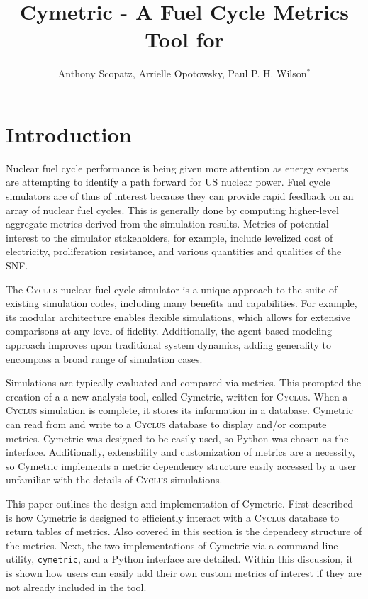 \documentclass{anstrans}
\title{Cymetric - A Fuel Cycle Metrics Tool for \cyclus}
\author{Anthony Scopatz, Arrielle Opotowsky, Paul P. H. Wilson$^{*}$}
\institute{
$^{*}$Department of Engineering Physics, University of Wisconsin - Madison, 
1500 Engineering Drive, Madison WI 53703
}
\newcommand{\cyclus}{\textsc{Cyclus}\xspace}
\newcommand{\code}[1]{{\color{code}\texttt{#1}}}
\begin{document}
\section{Introduction}
Nuclear fuel cycle performance is being given more attention as energy 
experts are attempting to identify a path forward for \gls{US} nuclear power. 
Fuel cycle simulators are of thus of interest because they can provide rapid 
feedback on an array of nuclear fuel cycles. This is generally done by 
computing higher-level aggregate metrics derived from the simulation results. 
Metrics of potential interest to the simulator stakeholders, for example, 
include levelized cost of electricity, proliferation resistance, and various 
quantities and qualities of the \gls{SNF}.

The \cyclus nuclear fuel cycle simulator is a unique approach to the suite of 
existing simulation codes, including many benefits and capabilities.
For example, its modular architecture enables flexible simulations, which 
allows for extensive comparisons at any level of fidelity. Additionally, the 
agent-based modeling approach improves upon traditional system dynamics, adding 
generality to encompass a broad range of simulation cases. \cite{cyclus2015, cyclus_v1.2} 

Simulations are typically evaluated and compared via metrics. This 
prompted the creation of a a new analysis tool, called Cymetric, written for 
\cyclus. When a \cyclus simulation is complete, it stores its information in a 
database. Cymetric can read from and write to a \cyclus database to display 
and/or compute metrics. Cymetric was designed to be easily used, so Python was 
chosen as the interface. Additionally, extensbility and customization of metrics
are a necessity, so Cymetric implements a metric dependency structure easily accessed by a user unfamiliar with the details of \cyclus simulations.

This paper outlines the design and implementation of Cymetric. First described 
is how Cymetric is designed to efficiently interact with a \cyclus database to 
return tables of metrics. Also covered in this section is the dependecy structure of the metrics. 
Next, the two implementations of Cymetric via a command line utility, \code{cymetric},
and a Python interface are detailed.  Within this discussion, it is shown how users can easily 
add their own custom metrics of interest if they are not already included in the
tool. 
\end{document}
